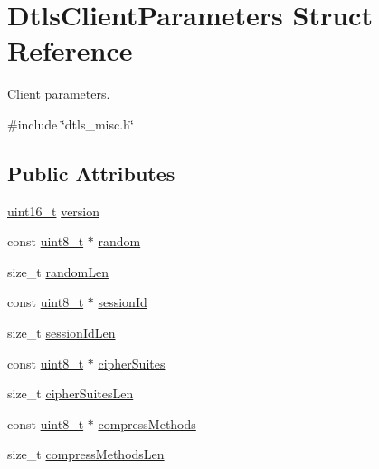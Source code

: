 \hypertarget{structDtlsClientParameters}{}\section{Dtls\+Client\+Parameters Struct Reference}
\label{structDtlsClientParameters}


Client parameters.  




{\ttfamily \#include \char`\"{}dtls\+\_\+misc.\+h\char`\"{}}

\subsection*{Public Attributes}
\begin{DoxyCompactItemize}
\item 
\hyperlink{stdint_8h_a273cf69d639a59973b6019625df33e30}{uint16\+\_\+t} \hyperlink{structDtlsClientParameters_a76502088d967b0f240e8804b585e019a}{version}
\item 
const \hyperlink{stdint_8h_aba7bc1797add20fe3efdf37ced1182c5}{uint8\+\_\+t} $\ast$ \hyperlink{structDtlsClientParameters_af465b2ea577f66ff4ebf3b83e5c0b854}{random}
\item 
size\+\_\+t \hyperlink{structDtlsClientParameters_a08ff7ceea84f110d641bc30a7adcdd9e}{random\+Len}
\item 
const \hyperlink{stdint_8h_aba7bc1797add20fe3efdf37ced1182c5}{uint8\+\_\+t} $\ast$ \hyperlink{structDtlsClientParameters_a6671f99ef473de11b1b7c1b76e8e2cb8}{session\+Id}
\item 
size\+\_\+t \hyperlink{structDtlsClientParameters_aca04db05a88059730c97a3dcc25705c0}{session\+Id\+Len}
\item 
const \hyperlink{stdint_8h_aba7bc1797add20fe3efdf37ced1182c5}{uint8\+\_\+t} $\ast$ \hyperlink{structDtlsClientParameters_ab32c1230661533668c5675127371f0d3}{cipher\+Suites}
\item 
size\+\_\+t \hyperlink{structDtlsClientParameters_a06be73dd013213bf25b4f651f6d5efa8}{cipher\+Suites\+Len}
\item 
const \hyperlink{stdint_8h_aba7bc1797add20fe3efdf37ced1182c5}{uint8\+\_\+t} $\ast$ \hyperlink{structDtlsClientParameters_a233abf95be55fe711b945119c08ffd07}{compress\+Methods}
\item 
size\+\_\+t \hyperlink{structDtlsClientParameters_a0910d54a373e1c9b1dbfe47cc45458d6}{compress\+Methods\+Len}
\end{DoxyCompactItemize}


